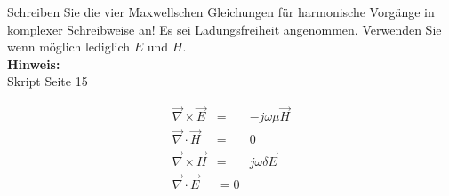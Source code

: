 \begin{question}[section=2,name={Maxwell harmonisch},difficulty=,quantity=3,type=thr,tags={20131024}]
	Schreiben Sie die vier Maxwellschen Gleichungen für harmonische Vorgänge in komplexer Schreibweise an! Es sei Ladungsfreiheit angenommen. Verwenden Sie wenn möglich lediglich $E$ und $H$.
	\\ \textbf{Hinweis:}\\
	Skript Seite 15
\end{question}
\begin{solution}
	\begin{eqnarray}
		\vec{\nabla} \times \vec{E} &=& -j \omega \mu \vec{H}\\
		\vec{\nabla} \cdot \vec{H} &=& 0\\
  \vec{\nabla} \times \vec{H} &=& j \omega \delta \vec{E}\\
\vec{\nabla} \cdot \vec{E} &= 0
  \end{eqnarray}
\end{solution}